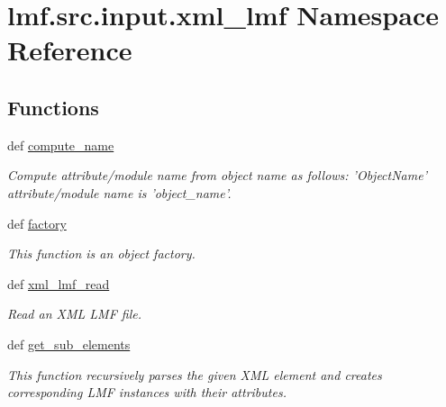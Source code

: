 \hypertarget{namespacelmf_1_1src_1_1input_1_1xml__lmf}{\section{lmf.\+src.\+input.\+xml\+\_\+lmf Namespace Reference}
\label{namespacelmf_1_1src_1_1input_1_1xml__lmf}
}
\subsection*{Functions}
\begin{DoxyCompactItemize}
\item 
def \hyperlink{namespacelmf_1_1src_1_1input_1_1xml__lmf_a1f88f5cb321107e2e3fc973a0f4bb0c7}{compute\+\_\+name}
\begin{DoxyCompactList}\small\item\em Compute attribute/module name from object name as follows\+: 'Object\+Name' attribute/module name is 'object\+\_\+name'. \end{DoxyCompactList}\item 
def \hyperlink{namespacelmf_1_1src_1_1input_1_1xml__lmf_ad5950c4bfa3184c81159c4f1be1f4e43}{factory}
\begin{DoxyCompactList}\small\item\em This function is an object factory. \end{DoxyCompactList}\item 
def \hyperlink{namespacelmf_1_1src_1_1input_1_1xml__lmf_ab05e23f6bb643a98979becb219b050da}{xml\+\_\+lmf\+\_\+read}
\begin{DoxyCompactList}\small\item\em Read an X\+M\+L L\+M\+F file. \end{DoxyCompactList}\item 
def \hyperlink{namespacelmf_1_1src_1_1input_1_1xml__lmf_a69c23caee6c3bfe7ba54804aad65f879}{get\+\_\+sub\+\_\+elements}
\begin{DoxyCompactList}\small\item\em This function recursively parses the given X\+M\+L element and creates corresponding L\+M\+F instances with their attributes. \end{DoxyCompactList}\end{DoxyCompactItemize}


